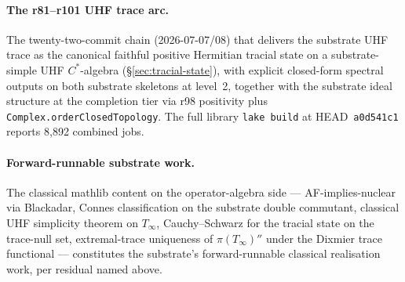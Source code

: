 \documentclass[11pt,a4paper]{amsart}
\theoremstyle{plain}
\theoremstyle{definition}
\begin{document}
\paragraph{The r81--r101 UHF trace arc.} The twenty-two-commit chain (2026-07-07/08) that delivers the substrate UHF trace as the canonical faithful positive Hermitian tracial state on a substrate-simple UHF $C^*$-algebra (\S\ref{sec:tracial-state}), with explicit closed-form spectral outputs on both substrate skeletons at level~2, together with the substrate ideal structure at the completion tier via r98 positivity plus \texttt{Complex.orderClosedTopology}. The full library \texttt{lake build} at HEAD~\texttt{a0d541c1} reports 8{,}892 combined jobs.

\paragraph{Forward-runnable substrate work.} The classical mathlib content on the operator-algebra side --- AF-implies-nuclear via Blackadar, Connes classification on the substrate double commutant, classical UHF simplicity theorem on $T_\infty$, Cauchy--Schwarz for the tracial state on the trace-null set, extremal-trace uniqueness of $\pi(T_\infty)''$ under the Dixmier trace functional --- constitutes the substrate's forward-runnable classical realisation work, per residual named above.
\end{document}
